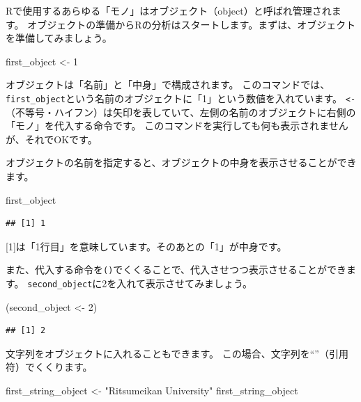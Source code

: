 \documentclass[]{book}
\newenvironment{Shaded}{\begin{snugshade}}{\end{snugshade}}
\newcommand{\DecValTok}[1]{\textcolor[rgb]{0.00,0.00,0.81}{#1}}
\newcommand{\StringTok}[1]{\textcolor[rgb]{0.31,0.60,0.02}{#1}}
\newcommand{\NormalTok}[1]{#1}
\begin{document}
Rで使用するあらゆる「モノ」はオブジェクト（object）と呼ばれ管理されます。
オブジェクトの準備からRの分析はスタートします。まずは、オブジェクトを準備してみましょう。

\begin{Shaded}
\begin{Highlighting}[]
\NormalTok{first_object <-}\StringTok{ }\DecValTok{1} 
\end{Highlighting}
\end{Shaded}

オブジェクトは「名前」と「中身」で構成されます。
このコマンドでは、\texttt{first\_object}という名前のオブジェクトに「1」という数値を入れています。
\texttt{\textless{}-}（不等号・ハイフン）は矢印を表していて、左側の名前のオブジェクトに右側の「モノ」を代入する命令です。
このコマンドを実行しても何も表示されませんが、それでOKです。

オブジェクトの名前を指定すると、オブジェクトの中身を表示させることができます。

\begin{Shaded}
\begin{Highlighting}[]
\NormalTok{first_object}
\end{Highlighting}
\end{Shaded}

\begin{verbatim}
## [1] 1
\end{verbatim}

{[}1{]}は「1行目」を意味しています。そのあとの「1」が中身です。

また、代入する命令を\texttt{()}でくくることで、代入させつつ表示させることができます。
\texttt{second\_object}に2を入れて表示させてみましょう。

\begin{Shaded}
\begin{Highlighting}[]
\NormalTok{(second_object <-}\StringTok{ }\DecValTok{2}\NormalTok{)}
\end{Highlighting}
\end{Shaded}

\begin{verbatim}
## [1] 2
\end{verbatim}

文字列をオブジェクトに入れることもできます。
この場合、文字列を``''（引用符）でくくります。

\begin{Shaded}
\begin{Highlighting}[]
\NormalTok{first_string_object <-}\StringTok{ "Ritsumeikan University"}
\NormalTok{first_string_object}
\end{Highlighting}
\end{Shaded}
\end{document}
